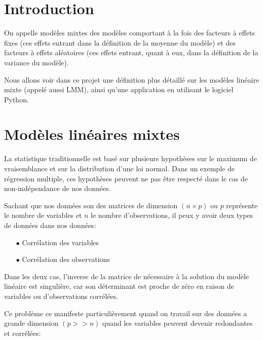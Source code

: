 \section{Introduction}

On appelle modèles mixtes des modèles comportant à la fois des facteurs à effets fixes (ces effets entrant dans la définition de la moyenne du modèle) et des facteurs à effets aléatoires (ces effets entrant, quant à eux, dans la définition de la variance du modèle).

Nous allons voir dans ce projet une définition plus détaillé sur les modèles linéaire mixte (appelé aussi LMM), ainsi qu'une application en utilisant le logiciel Python. 

\section{Modèles linéaires mixtes}

La statistique traditionnelle est basé sur plusieurs hypothèses sur le maximum de vraisemblance et sur la distribution d'une loi normal. Dans un exemple de régression multiple, ces hypothèses peuvent ne pas être respecté dans le cas de non-indépendance de nos données.

Sachant que nos données son des matrices de dimension $(n\times p)$ ou $p$ représente le nombre de variables et $n$ le nombre d'observations, il peux y avoir deux types de données dans nos données:

\begin{itemize}
    \item[$\bullet$] Corrélation des variables
    \item[$\bullet$] Corrélation des observations
\end{itemize}

Dans les deux cas, l'inverse de la matrice de nécessaire à la solution du modèle linéaire est singulière, car son déterminant est proche de zéro en raison de variables ou d'observations corrélées.

Ce problème ce manifeste particulièrement quand on travail sur des données a grande dimension $(p>>n)$ quand les variables peuvent devenir redondantes et corrélées:


